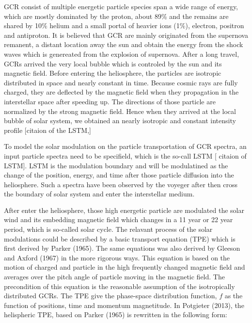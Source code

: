 \acs{GCR} consist of multiple energetic particle species span a wide range of energy, which are mostly dominated by the proton, about 89\%  and the remains are shared by 10\% helium and a small portal of heavier ions (1\%), electron, positron and antiproton. 
It is believed that \acs{GCR} are mainly originated from the supernova remanent, a distant location away the sun \citep{Blasi2013AARv2013,Bhattacarjee2000PhR,Fermi1949PhRv} and obtain the energy from the shock waves which is genereated from the explosion of supernova. \citep{blandford1978particle}
After a long travel, \acp{GCR} arrived the very local bubble which is controled by the sun and its magnetic field. Before entering the heliosphere, the particles are isotropic distributed in space and nearly constant in time. Because cosmic rays are fully charged, they are deflected by the magnetic field when they propagation in the interstellar space after speeding up. The directions of those particle are normalized by the strong magnetic field. Hence when they arrived at the local bubble of solar system, we obtained an nearly isotropic and constant intensity profile [citaion of the LSTM,]

To model the solar modulation on the particle transportation of GCR spectra, an input particle spectra need to be specifield, which is the so-call LSTM [ citaion of LSTM]. LSTM is the modulation boundary and will be modulatined as the change of the position, energy, and time after those particle diffusion into the heliosphere. Such a spectra have been observed by the voyeger after then cross the boundary of solar system and enter the interstellar medium.


After enter the heliosphere, those high energetic particle are modulated the solar wind and its embedding magnetic field  which changes in a 11 year or 22 year period, which is so-called solar cycle.
The relavant process of the solar modulations could be described by a basic transport equation (TPE) which is first derived by Parker (1965). The same equations was also derived by Gleeson and Axford (1967) in the more rigorous ways. This equation is based on the motion of charged and particle in the high frequently changed magnetic field and averages over the pitch angle of particle moving in the magnetic field. The precondition of this equation is the reasonable assumption of the isotropically distributed GCRs. The TPE give the phase-space distribution function, $f$ as the function of positions, time and momentum magnetitude. In Potgieter (2013), the helispheric TPE, based on Parker (1965) is rewritten in the following form:

